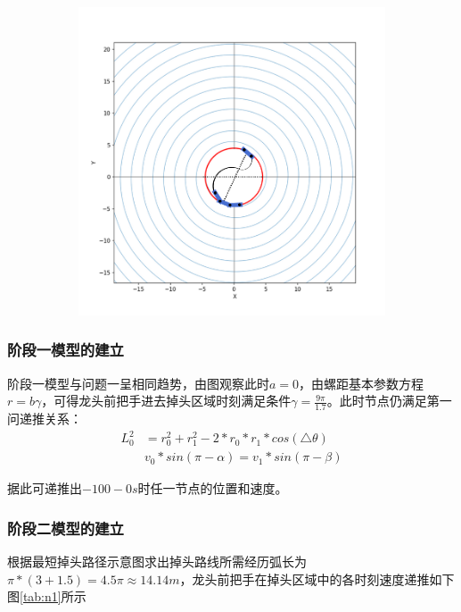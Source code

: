 \documentclass[withoutpreface,bwprint]{cumcmthesis}
\begin{document}
\begin{figure}[htbp!]
\begin{subfigure}[t]{0.32\textwidth}
		\label{fig:s2}
	\end{subfigure}
	\begin{subfigure}[t]{0.32\textwidth}
		\includegraphics[width=\textwidth]{pics/sch3}
		\label{fig:s3}
	\end{subfigure}
	\label{a}
\end{figure}
\subsubsection{阶段一模型的建立}
阶段一模型与问题一呈相同趋势，由图观察此时$a=0$，由螺距基本参数方程$r = b\gamma$，可得龙头前把手进去掉头区域时刻满足条件$\gamma = \frac{9\pi}{1.7}$。此时节点仍满足第一问递推关系：
\begin{align*}
	L_0^2 &= r_0^2 +r_1^2 - 2*r_0*r_1*cos(\triangle\theta)\\
	&v_0*sin(\pi-\alpha) = v_1*sin(\pi-\beta)
\end{align*}

据此可递推出$−100-0s$时任一节点的位置和速度。

\subsubsection{阶段二模型的建立}
根据最短掉头路径示意图求出掉头路线所需经历弧长为$\pi*(3+1.5) = 4.5\pi \approx 14.14m$，龙头前把手在掉头区域中的各时刻速度递推如下图\ref{tab:n1}所示
\end{document}
